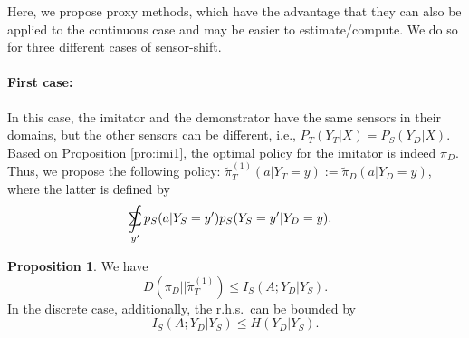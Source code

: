 \documentclass[letterpaper]{article} %
\theoremstyle{definition}%
\theoremstyle{definition}
\newtheorem{proposition}{Proposition}
\newcommand{\Obs}{Y}
\newcommand{\obs}{y}
\newcommand{\todo}[1]{\textcolor{red}{#1}}
\DeclareMathOperator*{\SumInt}{%
	\mathchoice%
	{\ooalign{$\sum$\cr\hidewidth$\displaystyle\int$\hidewidth\cr}}
	{\ooalign{\raisebox{.14\height}{\scalebox{.7}{$\textstyle\sum$}}\cr\hidewidth$\textstyle\int$\hidewidth\cr}}
	{\ooalign{\raisebox{.2\height}{\scalebox{.6}{$\scriptstyle\sum$}}\cr$\scriptstyle\int$\cr}}
	{\ooalign{\raisebox{.2\height}{\scalebox{.6}{$\scriptstyle\sum$}}\cr$\scriptstyle\int$\cr}}
}
\begin{document}
Here, we propose proxy methods, which have the advantage that they can also be applied to the continuous case and may be easier to estimate/compute.
We do so for three different cases of sensor-shift. %

\paragraph{First case:} 
In this case, the imitator and the demonstrator have the same sensors in their domains, but the other sensors can be different, i.e., $P_T(\Obs_T|X)=P_S(\Obs_D|X)$.
Based on  Proposition \ref{pro:imi1}, the optimal policy for the imitator is indeed $\pi_D$. Thus, we propose the following policy: $\tilde{\pi}^{(1)}_T(a | Y_T=y):=\tilde{\pi}_D(a|\Obs_D=y)$, where the latter is defined by 

\begin{align}\label{eq:proxy_2}
&\SumInt_{\obs'} p_S(a|\Obs_S=y')p_S(\Obs_S=y'|\Obs_D=y).
\end{align}

\begin{proposition}\label{pro:imi2}
We have
$$
D( {\pi}_D|| \tilde{\pi}^{(1)}_T)\leq I_S(A;\Obs_D|\Obs_S).
$$ 
In the discrete case, additionally, the r.h.s.\ can be bounded by 
$$
I_S(A;\Obs_D|\Obs_S)\leq H(\Obs_D|\Obs_S).
$$
\end{proposition}
\end{document}
